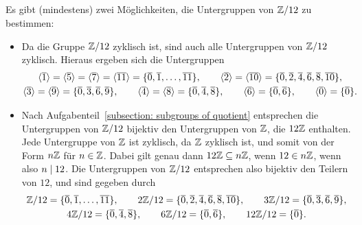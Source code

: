 \subsection{}

Es gibt (mindestens) zwei Möglichkeiten, die Untergruppen von $\mathbb{Z}/12$ zu bestimmen:

\begin{itemize}
  \item
    Da die Gruppe $\mathbb{Z}/12$ zyklisch ist, sind auch alle Untergruppen von $\mathbb{Z}/12$ zyklisch.
    Hieraus ergeben sich die Untergruppen
    \begin{gather*}
          \langle \overline{1} \rangle
       =  \langle \overline{5} \rangle
       =  \langle \overline{7} \rangle
       =  \langle \overline{11} \rangle
       =  \{ \overline{0}, \overline{1}, \dotsc, \overline{11} \},
      \qquad
          \langle \overline{2} \rangle
       =  \langle \overline{10} \rangle
       =  \{ \overline{0}, \overline{2}, \overline{4}, \overline{6}, \overline{8}, \overline{10} \},
      \\
          \langle \overline{3} \rangle
       =  \langle \overline{9} \rangle
       =  \{ \overline{0}, \overline{3}, \overline{6}, \overline{9}\},
      \qquad
          \langle \overline{4} \rangle
       =  \langle \overline{8} \rangle
       =  \{ \overline{0}, \overline{4}, \overline{8} \},
      \qquad
          \langle \overline{6} \rangle
       =  \{ \overline{0}, \overline{6} \},
      \qquad
          \langle \overline{0} \rangle
       =  \{ \overline{0} \}.
    \end{gather*}
  \item
    Nach Aufgabenteil~\ref{subsection: subgroups of quotient} entsprechen die Untergruppen von $\mathbb{Z}/12$ bijektiv den Untergruppen von $\mathbb{Z}$, die $12\mathbb{Z}$ enthalten.
    Jede Untergruppe von $\mathbb{Z}$ ist zyklisch, da $\mathbb{Z}$ zyklisch ist, und somit von der Form $n\mathbb{Z}$ für $n \in \mathbb{Z}$.
    Dabei gilt genau dann $12\mathbb{Z} \subseteq n\mathbb{Z}$, wenn $12 \in n\mathbb{Z}$, wenn also $n \mathrel{|} 12$.
    Die Untergruppen von $\mathbb{Z}/12$ entsprechen also bijektiv den Teilern von $12$, und sind gegeben durch
    \begin{gather*}
       \mathbb{Z}/12  = \{ \overline{0}, \overline{1}, \dotsc, \overline{11} \},
      \qquad
      2\mathbb{Z}/12  = \{ \overline{0}, \overline{2}, \overline{4}, \overline{6}, \overline{8}, \overline{10} \},
      \qquad
      3\mathbb{Z}/12  = \{ \overline{0}, \overline{3}, \overline{6}, \overline{9} \},
      \\
      4\mathbb{Z}/12  = \{ \overline{0}, \overline{4}, \overline{8} \},
      \qquad
      6\mathbb{Z}/12  = \{ \overline{0}, \overline{6} \},
      \qquad
      12\mathbb{Z}/12 = \{ \overline{0} \}.
    \end{gather*}
\end{itemize}

